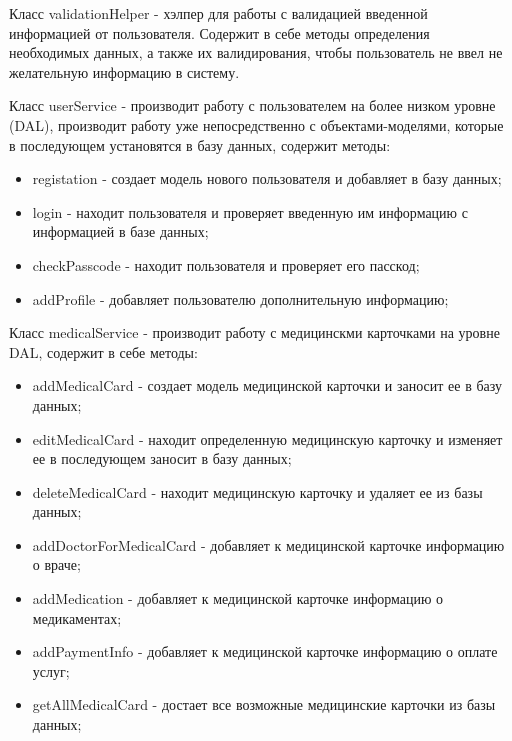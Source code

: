 Класс validationHelper - хэлпер для работы с валидацией введенной информацией от пользователя. Содержит в себе методы определения необходимых данных, а также их валидирования, чтобы пользователь не ввел не желательную информацию в систему.

Класс userService - производит работу с пользователем на более низком уровне (DAL), производит работу уже непосредственно с объектами-моделями, которые в последующем установятся в базу данных, содержит методы:
\begin{itemize}
  \item registation - создает модель нового пользователя и добавляет в базу данных;
  \item login - находит пользователя и проверяет введенную им информацию с информацией в базе данных;
  \item checkPasscode - находит пользователя и проверяет его пасскод;
  \item addProfile - добавляет пользователю дополнительную информацию;
\end{itemize}

Класс medicalService - производит работу с медицинскми карточками на уровне DAL, содержит в себе методы:
\begin{itemize}
  \item addMedicalCard - создает модель медицинской карточки и заносит ее в базу данных;
  \item editMedicalCard - находит определенную медицинскую карточку и изменяет ее в последующем заносит в базу данных;
  \item deleteMedicalCard - находит медицинскую карточку и удаляет ее из базы данных;
  \item addDoctorForMedicalCard - добавляет к медицинской карточке информацию о враче;
  \item addMedication - добавляет к медицинской карточке информацию о медикаментах;
  \item addPaymentInfo - добавляет к медицинской карточке информацию о оплате услуг;
  \item getAllMedicalCard - достает все возможные медицинские карточки из базы данных;
\end{itemize}